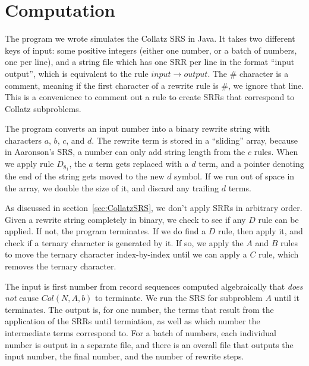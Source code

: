 \section{Computation} \label{subsec:rewritecomp}
The program we wrote simulates the Collatz SRS in Java. It takes two different keys of input: some positive integers (either one number, or a batch of numbers, one per line), and a string file which has one SRR per line in the format ``input output'', which is equivalent to the rule $input \rightarrow output$. The \# character is a comment, meaning if the first character of a rewrite rule is \#, we ignore that line. This is a convenience to comment out a rule to create SRRs that correspond to Collatz subproblems. \par
The program converts an input number into a binary rewrite string with characters $a$, $b$, $c$, and $d$. The rewrite term is stored in a ``sliding'' array, because in Aaronson's SRS, a number can only add string length from the $c$ rules. When we apply rule $D_{8_1}$, the $a$ term gets replaced with a $d$ term, and a pointer denoting the end of the string gets moved to the new $d$ symbol. If we run out of space in the array, we double the size of it, and discard any trailing $d$ terms. \par
As discussed in section~\ref{sec:CollatzSRS}, we don't apply SRRs in arbitrary order. Given a rewrite string completely in binary, we check to see if any $D$ rule can be applied. If not, the program terminates. If we do find a $D$ rule, then apply it, and check if a ternary character is generated by it. If so, we apply the $A$ and $B$ rules to move the ternary character index-by-index until we can apply a $C$ rule, which removes the ternary character. \par
The input is first number from record sequences computed algebraically that \textit{does not} cause $Col(N,A,b)$ to terminate. We run the SRS for subproblem $A$ until it terminates. The output is, for one number, the terms that result from the application of the SRRs until termiation, as well as which number the intermediate terms correspond to. For a batch of numbers, each individual number is output in a separate file, and there is an overall file that outputs the input number, the final number, and the number of rewrite steps.

